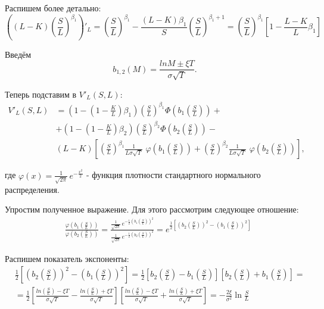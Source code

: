 \documentclass[oneside,final,12pt]{article}
\begin{document}
Распишем более детально:
$$
\left( (L-K) \left( \frac{S}{L}\right)^{\beta_1} \right)'_L = 
\left( \frac{S}{L}\right)^{\beta_1} - \frac{(L-K)\beta_1}{S} \left( \frac{S}{L}\right)^{\beta_1+1} =
\left( \frac{S}{L}\right)^{\beta_1} \left[ 1-\frac{L-K}{L}\beta_1 \right]
$$

Введём
$$
b_{1,2}(M)=\frac{ln M \pm \xi T}{\sigma \sqrt{T}}.
$$

Теперь подставим в $V'_L(S,L)$:
\begin{align*}
    V'_L(S,L) & = \left( 1 - \left(1-\frac{K}{L}\right)\beta_1  \right) 
    \left( \frac{S}{L}\right)^{\beta_1} \Phi\left(b_1\left(\frac{S}{L}\right)\right) + \\
    & + \left( 1 - \left(1-\frac{K}{L}\right)\beta_2  \right) 
    \left( \frac{S}{L}\right)^{\beta_2} \Phi\left(b_2\left(\frac{S}{L}\right)\right) - \\
     & (L-K) \left[ \left(  \frac{S}{L}\right)^{\beta_1} \frac{1}{L\sigma\sqrt{T}} \, \, \varphi\left(b_1\left(\frac{S}{L}\right)\right) + 
    \left( \frac{S}{L}\right)^{\beta_2} \frac{1}{L\sigma\sqrt{T}} \, \, \varphi\left(b_2\left(\frac{S}{L}\right)\right) \right],
\end{align*}

\noindent
где $\varphi(x)=\frac{1}{\sqrt{2\pi}} \, e^{-\frac{x^2}{2}}$ - функция плотности стандартного нормального распределения.

Упростим полученное выражение. Для этого рассмотрим следующее отношение:
\begin{align*}
    & \frac{ \varphi\left(b_1\left(\frac{S}{L}\right)\right) }
           { \varphi\left(b_2\left(\frac{S}{L}\right)\right) }
    = \frac{ \frac{1}{\sqrt{2\pi}} \, e^{-\frac{1}{2}                                   \left(b_1\left(\frac{S}{L}\right)\right)^2} }
           { \frac{1}{\sqrt{2\pi}} \, e^{-\frac{1}{2}                    \left(b_2\left(\frac{S}{L}\right)\right)^2} } =
    e^{\frac{1}{2}\left[ \left(b_2\left(\frac{S}{L}\right)\right)^2 -
    \left(b_1\left(\frac{S}{L}\right)\right)^2 \right]}
\end{align*}

Распишем показатель экспоненты:
\begin{align*}
    & \frac{1}{2}\left[ \left(b_2\left(\frac{S}{L}\right)\right)^2 -
    \left(b_1\left(\frac{S}{L}\right)\right)^2 \right] = 
    \frac{1}{2}\left[ b_2\left(\frac{S}{L}\right) -
    b_1\left(\frac{S}{L}\right) \right] 
    \left[ b_2\left(\frac{S}{L}\right) +
    b_1\left(\frac{S}{L}\right) \right] = \\
    & = \frac{1}{2}\left[ \frac{ln \left(\frac{S}{L}\right)  - \xi T}{\sigma \sqrt{T}} - \frac{ln \left(\frac{S}{L}\right)  + \xi T}{\sigma \sqrt{T}} \right]
    \left[ \frac{ln \left(\frac{S}{L}\right)  - \xi T}{\sigma \sqrt{T}} + \frac{ln \left(\frac{S}{L}\right)  + \xi T}{\sigma \sqrt{T}} \right] = 
    - \frac{2 \xi}{\sigma^2} \ln \frac{S}{L}
\end{align*}
\end{document}
